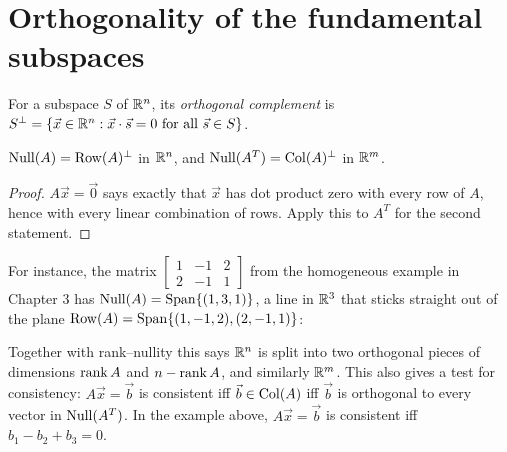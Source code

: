 \section{Orthogonality of the fundamental subspaces}

\begin{definition}
For a subspace $S$ of $\mathbb{R}^n$, its \emph{orthogonal complement} is
$S^\perp=\{\vec x\in\mathbb{R}^n:\vec x\cdot\vec s=0 \text{ for all } \vec s\in S\}$.
\end{definition}

\begin{theorem}
$\operatorname{Null}(A)=\operatorname{Row}(A)^\perp$ in $\mathbb{R}^n$, and $\operatorname{Null}(A^T)=\operatorname{Col}(A)^\perp$ in $\mathbb{R}^m$.
\end{theorem}
\begin{proof}
$A\vec x=\vec0$ says exactly that $\vec x$ has dot product zero with every row of $A$, hence with
every linear combination of rows. Apply this to $A^T$ for the second statement.
\end{proof}

For instance, the matrix $\begin{bmatrix}1&-1&2\\2&-1&1\end{bmatrix}$ from the homogeneous example in
Chapter 3 has $\operatorname{Null}(A) = \operatorname{Span}\{(1,3,1)\}$, a line in $\mathbb{R}^3$ that sticks straight out of the plane
$\operatorname{Row}(A) = \operatorname{Span}\{(1,-1,2),(2,-1,1)\}$:
\begin{center}
\end{center}

Together with rank--nullity this says $\mathbb{R}^n$ is split into two orthogonal pieces of dimensions
$\operatorname{rank} A$ and $n-\operatorname{rank} A$, and similarly $\mathbb{R}^m$. This also gives a test for consistency:
$A\vec x=\vec b$ is consistent iff $\vec b\in\operatorname{Col}(A)$ iff $\vec b$ is orthogonal to every vector in
$\operatorname{Null}(A^T)$. In the example above, $A\vec x=\vec b$ is consistent iff $b_1-b_2+b_3=0$.

